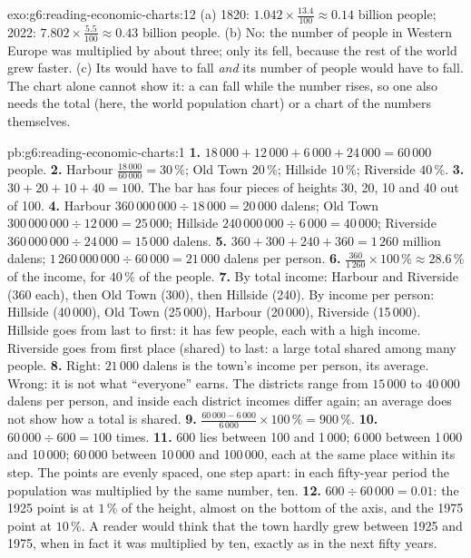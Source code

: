 \begin{solution}{exo:g6:reading-economic-charts:12}
(a) 1820: $1.042 \times \frac{13.4}{100} \approx 0.14$ billion people;
2022: $7.802 \times \frac{5.5}{100} \approx 0.43$ billion people. (b) No: the
number of people in Western Europe was multiplied by about three; only its
 fell, because the rest of the world grew faster. (c) Its  would have
to fall \emph{and} its number of people would have to fall. The  chart
alone cannot show it: a  can fall while the number rises, so one also needs
the total (here, the world population chart) or a chart of the numbers
themselves.
\end{solution}

\begin{solution}{pb:g6:reading-economic-charts:1}
\textbf{1.} $18\,000 + 12\,000 + 6\,000 + 24\,000 = 60\,000$ people.
\textbf{2.} Harbour $\frac{18\,000}{60\,000} = 30\,\%$; Old Town $20\,\%$;
Hillside $10\,\%$; Riverside $40\,\%$.
\textbf{3.} $30 + 20 + 10 + 40 = 100$. The bar has four pieces of heights 30, 20,
10 and 40 out of 100.
\textbf{4.} Harbour $360\,000\,000 \div 18\,000 = 20\,000$ dalens; Old Town
$300\,000\,000 \div 12\,000 = 25\,000$; Hillside $240\,000\,000 \div 6\,000 =
40\,000$; Riverside $360\,000\,000 \div 24\,000 = 15\,000$ dalens.
\textbf{5.} $360 + 300 + 240 + 360 = 1\,260$ million dalens;
$1\,260\,000\,000 \div 60\,000 = 21\,000$ dalens per person.
\textbf{6.} $\frac{360}{1\,260} \times 100\,\% \approx 28.6\,\%$ of the income,
for $40\,\%$ of the people.
\textbf{7.} By total income: Harbour and Riverside (360 each), then Old Town
(300), then Hillside (240). By income per person: Hillside (40\,000), Old Town
(25\,000), Harbour (20\,000), Riverside (15\,000). Hillside goes from last to
first: it has few people, each with a high income. Riverside goes from first
place (shared) to last: a large total shared among many people.
\textbf{8.} Right: $21\,000$ dalens is the town's income per person, its
average. Wrong: it is not what ``everyone'' earns. The districts range from
$15\,000$ to $40\,000$ dalens per person, and inside each district incomes differ
again; an average does not show how a total is shared.
\textbf{9.} $\frac{60\,000 - 6\,000}{6\,000} \times 100\,\% = 900\,\%$.
\textbf{10.} $60\,000 \div 600 = 100$ times.
\textbf{11.} $600$ lies between 100 and 1\,000; $6\,000$ between 1\,000 and
10\,000; $60\,000$ between 10\,000 and 100\,000, each at the same place within
its step. The points are evenly spaced, one step apart: in each fifty-year
period the population was multiplied by the same number, ten.
\textbf{12.} $600 \div 60\,000 = 0.01$: the 1925 point is at $1\,\%$ of the
height, almost on the bottom of the axis, and the 1975 point at $10\,\%$. A
reader would think that the town hardly grew between 1925 and 1975, when in
fact it was multiplied by ten, exactly as in the next fifty years.
\end{solution}
